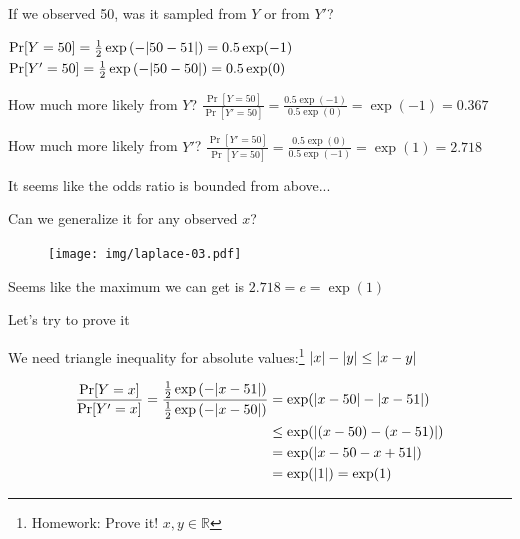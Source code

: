 \documentclass[12pt,aspectratio=169,handout]{beamer}
\begin{document}
\begin{frame}{If we observed 50, was it sampled from $Y$ or from $Y'$?}

$
\Pr[Y = 50] = \frac{1}{2} \exp \left(- \abs{50 - 51} \right) = 0.5 \exp(-1)
$
$
\Pr[Y' = 50] = \frac{1}{2} \exp \left(- \abs{50 - 50} \right) = 0.5 \exp(0)
$

How much more likely from $Y$?
$
\frac{\Pr[Y = 50]}{\Pr[Y' = 50]}
= \frac{0.5 \exp(-1)}{0.5 \exp(0)} = \exp(-1) = 0.367
$

How much more likely from $Y'$?
$
\frac{\Pr[Y' = 50]}{\Pr[Y = 50]}
= \frac{0.5 \exp(0)}{0.5 \exp(-1)} = \exp(1) = 2.718
$

It seems like the odds ratio is bounded from above...

\end{frame}

\begin{frame}{Can we generalize it for any observed $x$?}

\begin{figure}
\centering
\texttt{[image: img/laplace-03.pdf]}
\end{figure}

Seems like the maximum we can get is $2.718 = e = \exp(1)$

\end{frame}


\begin{frame}{Let's try to prove it}

We need triangle inequality for absolute values:\footnote{Homework: Prove it! $x, y \in \mathbb{R}$}
$\abs{x} - \abs{y} \leq \abs{x - y}$

$$
\begin{aligned}
\frac{\Pr[Y = x]}{\Pr[Y' = x]} =
\frac{
\frac{1}{2} \exp \left(- \abs{x - 51} \right)
}{
\frac{1}{2} \exp \left(-\abs{x - 50} \right) 
}
&= \exp ( \abs{x - 50} - \abs{x - 51} ) \\
&\leq \exp ( \abs{(x - 50) - (x - 51)} ) \\
&= \exp ( \abs{x - 50 - x + 51} ) \\
&= \exp ( \abs{1}) = \exp(1) \\
\end{aligned}
$$

\end{frame}
\end{document}
